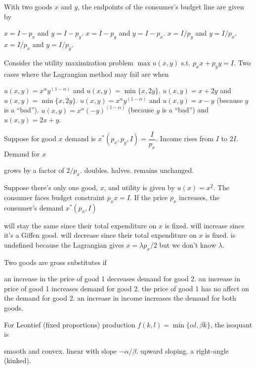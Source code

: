 \documentclass[addpoints,answers,12pt]{exam}
\begin{document}
\begin{questions}
\question[1] With two goods $x$ and $y$, the endpoints of the consumer's budget line are given by
\begin{choices}
    \choice $x=I-p_x$ and $y=I-p_y$.
    \choice $x=I-p_y$ and $y=I-p_x$.
    \choice $x=I/p_y$ and $y=I/p_x$.
    \CorrectChoice $x=I/p_x$ and $y=I/p_y$.
\end{choices}

\question[1] Consider the utility maximization problem $\max u(x,y)$ s.t. $p_x x+p_y y=I$. Two cases where the Lagrangian method may fail are when
\begin{choices}
    \choice $u(x,y)=x^\alpha y^{(1-\alpha)}$ and $u(x,y)=\min\{x,2y\}$.
    \CorrectChoice $u(x,y)=x+2y$ and $u(x,y)=\min\{x,2y\}$.
    \choice $u(x,y)=x^\alpha y^{(1-\alpha)}$ and $u(x,y)=x-y$ (because $y$ is a ``bad'').
    \choice $u(x,y)=x^\alpha (-y)^{(1-\alpha)}$ (because $y$ is a ``bad'') and $u(x,y)=2x+y$.
\end{choices}

\question[1] Suppose for good $x$ demand is $x^*(p_x,p_y,I)=\dfrac{I}{p_x}$. Income rises from $I$ to $2I$. Demand for $x$
\begin{choices}
    \choice grows by a factor of $2/p_x$.
    \CorrectChoice doubles.
    \choice halves.
    \choice remains unchanged.
\end{choices}

\newpage
\question[1] Suppose there's only one good, $x$, and utility is given by $u(x)=x^2$. The consumer faces budget constraint $p_x x = I$. If the price $p_x$ increases, the consumer's demand $x^*(p_x,I)$
\begin{choices}
    \choice will stay the same since their total expenditure on $x$ is fixed.
    \choice will increase since it's a Giffen good.
    \CorrectChoice will decrease since their total expenditure on $x$ is fixed.
    \choice is undefined because the Lagrangian gives $x=\lambda p_x/2$ but we don't know $\lambda$.
\end{choices}

\question[1] Two goods are gross substitutes if
\begin{choices}
    \choice an increase in the price of good 1 decreases demand for good 2.
    \CorrectChoice an increase in price of good 1 increases demand for good 2.
    \choice the price of good 1 has no affect on the demand for good 2.
    \choice an increase in income increases the demand for both goods.
\end{choices}

\question[1] For Leontief (fixed proportions) production $f(k,l)=\min\{\alpha l,\beta k\}$, the isoquant is
\begin{choices}
    \choice smooth and convex.
    \choice linear with slope $-\alpha/\beta$.
    \choice upward sloping.
    \CorrectChoice a right-angle (kinked).
\end{choices}


\end{questions}
\end{document}
